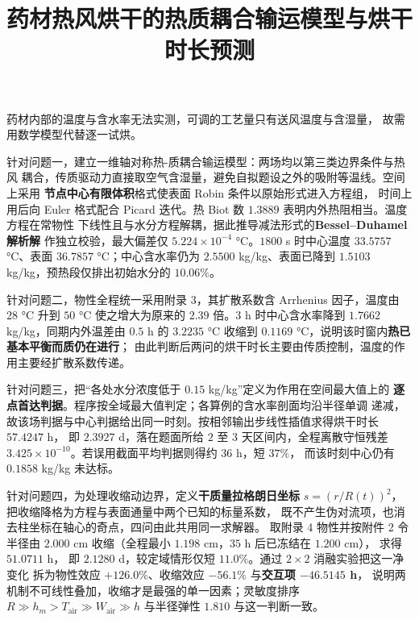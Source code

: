 \documentclass[withoutpreface,bwprint]{cumcmthesis}
\title{药材热风烘干的热质耦合输运模型与烘干时长预测}
\makeatletter
\renewenvironment{abstract}{%
  \if@twocolumn\section*{\abstractname}%
  \else\begin{center}{\zihao{3}\bfseries \abstractname\vspace{-.5em}\vspace{\z@}}\end{center}\quotation
  \fi}{\if@twocolumn\else\endquotation\newpage\fi}
\makeatother
\begin{document}
\maketitle

\begin{abstract}

药材内部的温度与含水率无法实测，可调的工艺量只有送风温度与含湿量，
故需用数学模型代替逐一试烘。

针对问题一，建立一维轴对称热-质耦合输运模型：两场均以第三类边界条件与热风
耦合，传质驱动力直接取空气含湿量，避免自拟题设之外的吸附等温线。空间上采用
\textbf{节点中心有限体积}格式使表面 Robin 条件以原始形式进入方程组，
时间上用后向 Euler
格式配合 Picard 迭代。热 Biot 数 $1.3889$ 表明内外热阻相当。温度方程在常物性
下线性且与水分方程解耦，据此推导减法形式的\textbf{Bessel--Duhamel 解析解}
作独立校验，最大偏差仅 $5.224\times10^{-4}$ °C。$1800$ s 时中心温度
$33.5757$ °C、表面 $36.7857$ °C；中心含水率仍为 $2.5500$ kg/kg、表面已降到
$1.5103$ kg/kg，预热段仅排出初始水分的 $10.06\%$。

针对问题二，物性全程统一采用附录 3，其扩散系数含 Arrhenius 因子，温度由
$28$ °C 升到 $50$ °C 使之增大为原来的 $2.39$ 倍。$3$ h 时中心含水率降到
$\mathbf{1.7662}$ kg/kg，同期内外温差由 $0.5$ h 的 $3.2235$ °C 收缩到
$0.1169$ °C，说明该时窗内\textbf{热已基本平衡而质仍在进行}；
由此判断后两问的烘干时长主要由传质控制，温度的作用主要经扩散系数传递。

针对问题三，把“各处水分浓度低于 $0.15$ kg/kg”定义为作用在空间最大值上的
\textbf{逐点首达判据}。程序按全域最大值判定；各算例的含水率剖面均沿半径单调
递减，故该场判据与中心判据给出同一时刻。按相邻输出步线性插值求得烘干时长
$\mathbf{57.4247}$ h，
即 $2.3927$ d，落在题面所给 $2$ 至 $3$ 天区间内，全程离散守恒残差
$3.425\times10^{-10}$。若误用截面平均判据则得约 $36$ h，短 $37\%$，
而该时刻中心仍有 $0.1858$ kg/kg 未达标。

针对问题四，为处理收缩动边界，定义\textbf{干质量拉格朗日坐标}
$s=(r/R(t))^2$，把收缩降格为方程与表面通量中两个已知的标量系数，
既不产生伪对流项，也消去柱坐标在轴心的奇点，四问由此共用同一求解器。
取附录 4 物性并按附件 2 令
半径由 $2.000$ cm 收缩（全程最小 $1.198$ cm，$35$ h 后已冻结在 $1.200$ cm），
求得 $\mathbf{51.0711}$ h，
即 $2.1280$ d，较定域情形仅短 $11.0\%$。通过 $2\times2$ 消融实验把这一净变化
拆为物性效应 $+126.0\%$、收缩效应 $-56.1\%$ 与\textbf{交互项 $-46.5145$ h}，
说明两机制不可线性叠加，收缩才是最强的单一因素；灵敏度排序
$R\gg h_m>T_{\mathrm{air}}\gg W_{\mathrm{air}}\gg h$ 与半径弹性 $1.810$
与这一判断一致。

\end{abstract}
\end{document}
